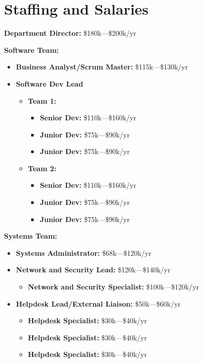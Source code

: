 \documentclass{report}
\begin{document}
\section{Staffing and Salaries}

\textbf{Department Director:} \$180k—\$200k/yr

\textbf{Software Team:}
\begin{itemize}
    \item \textbf{Business Analyst/Scrum Master:} \$115k—\$130k/yr
    \item \textbf{Software Dev Lead}
    \begin{itemize}
        \item \textbf{Team 1:}
        \begin{itemize}
            \item \textbf{Senior Dev:} \$110k—\$160k/yr
            \item \textbf{Junior Dev:} \$75k—\$90k/yr
            \item \textbf{Junior Dev:} \$75k—\$90k/yr
        \end{itemize}
        \item \textbf{Team 2:}
        \begin{itemize}
            \item \textbf{Senior Dev:} \$110k—\$160k/yr
            \item \textbf{Junior Dev:} \$75k—\$90k/yr
            \item \textbf{Junior Dev:} \$75k—\$90k/yr
        \end{itemize}
    \end{itemize}
\end{itemize}

\textbf{Systems Team:}
\begin{itemize}
    \item \textbf{Systems Administrator:} \$68k—\$120k/yr
    \item \textbf{Network and Security Lead:} \$120k—\$140k/yr
    \begin{itemize}
        \item \textbf{Network and Security Specialist:} \$100k—\$120k/yr
    \end{itemize}
    \item \textbf{Helpdesk Lead/External Liaison:} \$50k—\$60k/yr
    \begin{itemize}
        \item \textbf{Helpdesk Specialist:} \$30k—\$40k/yr
        \item \textbf{Helpdesk Specialist:} \$30k—\$40k/yr
        \item \textbf{Helpdesk Specialist:} \$30k—\$40k/yr
    \end{itemize}
\end{itemize}
\end{document}
